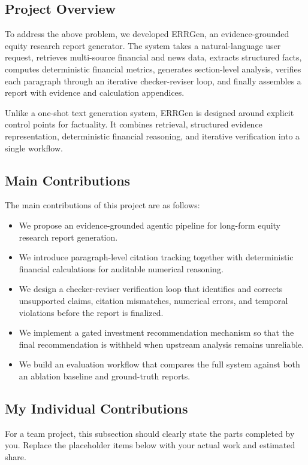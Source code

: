 \documentclass[11pt,a4paper]{article}
\begin{document}
\subsection{Project Overview}
To address the above problem, we developed ERRGen, an evidence-grounded
equity research report generator. The system takes a natural-language user
request, retrieves multi-source financial and news data, extracts structured
facts, computes deterministic financial metrics, generates section-level
analysis, verifies each paragraph through an iterative checker-reviser loop,
and finally assembles a report with evidence and calculation appendices.

Unlike a one-shot text generation system, ERRGen is designed around explicit
control points for factuality. It combines retrieval, structured evidence
representation, deterministic financial reasoning, and iterative verification
into a single workflow.

\subsection{Main Contributions}
The main contributions of this project are as follows:
\begin{itemize}[leftmargin=1.5em]
    \item We propose an evidence-grounded agentic pipeline for long-form equity
    research report generation.
    \item We introduce paragraph-level citation tracking together with
    deterministic financial calculations for auditable numerical reasoning.
    \item We design a checker-reviser verification loop that identifies and
    corrects unsupported claims, citation mismatches, numerical errors, and
    temporal violations before the report is finalized.
    \item We implement a gated investment recommendation mechanism so that the
    final recommendation is withheld when upstream analysis remains unreliable.
    \item We build an evaluation workflow that compares the full system against
    both an ablation baseline and ground-truth reports.
\end{itemize}

\subsection{My Individual Contributions}
For a team project, this subsection should clearly state the parts completed by
you. Replace the placeholder items below with your actual work and estimated
share.
\end{document}

